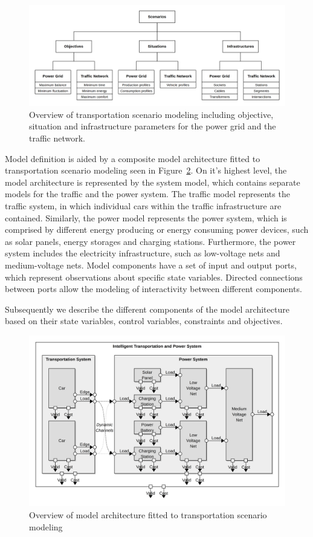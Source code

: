 \begin{figure}[t!]
	\centering
	\includegraphics[width=1\columnwidth]{../gfx/approach.png}
	\caption{Overview of transportation scenario modeling including objective, situation and infrastructure parameters for the power grid and the traffic network.}
	\label{fig:approach}
\end{figure}

Model definition is aided by a composite model architecture fitted to transportation scenario modeling seen in Figure~\ref{fig:model}. On it's highest level, the model architecture is represented by the system model, which contains separate models for the traffic and the power system. The traffic model represents the traffic system, in which individual cars within the traffic infrastructure are contained. Similarly, the power model represents the power system, which is comprised by different energy producing or energy consuming power devices, such as solar panels, energy storages and charging stations. Furthermore, the power system includes the electricity infrastructure, such as low-voltage nets and medium-voltage nets. Model components have a set of input and output ports, which represent observations about specific state variables. Directed connections between ports allow the modeling of interactivity between different components.

Subsequently we describe the different components of the model architecture based on their state variables, control variables, constraints and objectives. 

\begin{figure}[t!]
	\centering
	\includegraphics[width=0.925\columnwidth]{../gfx/model.png}
	\caption{Overview of model architecture fitted to transportation scenario modeling}
	\label{fig:model}
\end{figure}

